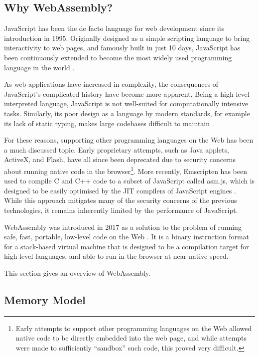 \subsection{Why WebAssembly?}

JavaScript has been the de facto language for web development since its introduction in 1995. Originally designed as a simple scripting language to bring interactivity to web pages, and famously built in just 10 days, JavaScript has been continuously extended to become the most widely used programming language in the world \cite{wirfs-brockJavaScriptfirst202020a}.

As web applications have increased in complexity, the consequences of JavaScript's complicated history have become more apparent. Being a high-level interpreted language, JavaScript is not well-suited for computationally intensive tasks. Similarly, its poor design as a language by modern standards, for example its lack of static typing, makes large codebases difficult to maintain \cite{ocarizajr.JavaScriptErrorsWild2011, biermanUnderstandingTypeScript2014}.

For these reasons, supporting other programming languages on the Web has been a much discussed topic. Early proprietary attempts, such as Java applets, ActiveX, and Flash, have all since been deprecated due to security concerns about running native code in the browser\footnote{Early attempts to support other programming languages on the Web allowed native code to be directly embedded into the web page, and while attempts were made to sufficiently ``sandbox'' such code, this proved very difficult.}. More recently, Emscripten has been used to compile C and C++ code to a subset of JavaScript called asm.js, which is designed to be easily optimised by the JIT compilers of JavaScript engines \cite{zakaiEmscriptenLLVMtoJavaScriptcompiler2011}. While this approach mitigates many of the security concerns of the previous technologies, it remains inherently limited by the performance of JavaScript.

WebAssembly was introduced in 2017 as a solution to the problem of running safe, fast, portable, low-level code on the Web \cite{haasBringingwebspeed2017}. It is a binary instruction format for a stack-based virtual machine that is designed to be a compilation target for high-level languages, and able to run in the browser at near-native speed.

This section gives an overview of WebAssembly.

\subsection{Memory Model}

